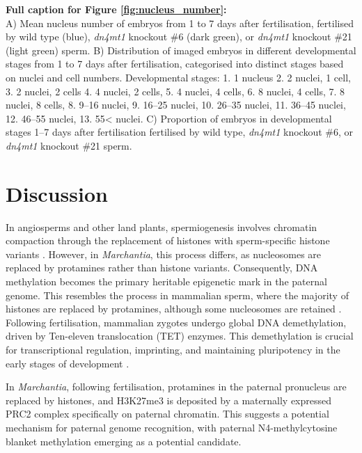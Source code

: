 \noindent\textbf{Full caption for Figure \ref{fig:nucleus_number}:} \\
A) Mean nucleus number of embryos from 1 to 7 days after fertilisation, fertilised by wild type (blue), \textit{dn4mt1} knockout \#6 (dark green), or \textit{dn4mt1} knockout \#21 (light green) sperm. 
B) Distribution of imaged embryos in different developmental stages from 1 to 7 days after fertilisation, categorised into distinct stages based on nuclei and cell numbers. 
Developmental stages: 1. 1 nucleus 2. 2 nuclei, 1 cell, 3. 2 nuclei, 2 cells 4. 4 nuclei, 2 cells, 5. 4 nuclei, 4 cells, 6. 8 nuclei, 4 cells, 7. 8 nuclei, 8 cells, 8. 9–16 nuclei, 9. 16–25 nuclei, 10. 26–35 nuclei, 11. 36–45 nuclei, 12. 46–55 nuclei, 13. 55< nuclei.
C) Proportion of embryos in developmental stages 1–7 days after fertilisation fertilised by wild type, \textit{dn4mt1} knockout \#6, or \textit{dn4mt1} knockout \#21 sperm.


\clearpage


\section{Discussion}

In angiosperms and other land plants, spermiogenesis involves chromatin compaction through the replacement of histones with sperm-specific histone variants \cite{RN283,RN284,RN285}. However, in \textit{Marchantia}, this process differs, as nucleosomes are replaced by protamines rather than histone variants. Consequently, DNA methylation becomes the primary heritable epigenetic mark in the paternal genome. This resembles the process in mammalian sperm, where the majority of histones are replaced by protamines, although some nucleosomes are retained \cite{RN282}. Following fertilisation, mammalian zygotes undergo global DNA demethylation, driven by  Ten-eleven translocation (TET) enzymes. This demethylation is crucial for transcriptional regulation, imprinting, and maintaining pluripotency in the early stages of development \cite{RN286,RN287}.

In \textit{Marchantia}, following fertilisation, protamines in the paternal pronucleus are replaced by histones, and H3K27me3 is deposited by a maternally expressed PRC2 complex \cite{RN160} specifically on paternal chromatin. This suggests a potential mechanism for paternal genome recognition, with paternal N4-methylcytosine blanket methylation emerging as a potential candidate.

